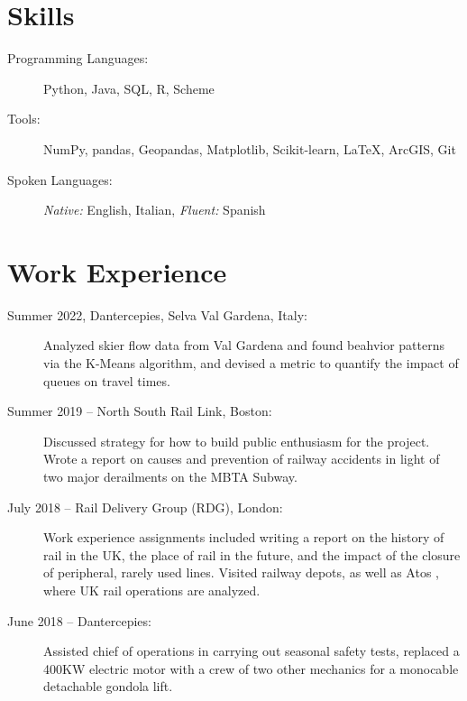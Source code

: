 \section*{Skills}
\secvspace
\begin{description}
    \item[Programming Languages:] Python, Java, SQL, R, Scheme
    \item[Tools:] NumPy, pandas, Geopandas, Matplotlib, Scikit-learn, \LaTeX, ArcGIS, Git
    \item[Spoken Languages:] {\em Native:} English, Italian, {\em Fluent:} Spanish
\end{description}
\cvhlineb
\section*{Work Experience}
\secvspace
\begin{description}
    \item[Summer 2022, Dantercepies, Selva Val Gardena, Italy:] Analyzed skier flow data from Val Gardena and found beahvior patterns via the K-Means algorithm, and devised a metric to quantify the impact of queues on travel times.
    \item[Summer 2019 -- North South Rail Link, Boston:]  Discussed strategy for how to build public enthusiasm for the project. Wrote a report on causes and prevention of railway accidents in light of two major derailments on the MBTA Subway.
    \item[July 2018 -- Rail Delivery Group (RDG), London: ] Work experience assignments included writing a report on the history of rail in the UK, the place of rail in the future, and the impact of the closure of peripheral, rarely used lines. Visited railway depots, as well as Atos , where UK rail operations are analyzed.

    \item[June 2018 -- Dantercepies:] Assisted chief of operations in carrying out seasonal safety tests, replaced a 400KW electric motor with a crew of two other mechanics for a monocable detachable gondola lift.
\end{description}
\cvhlineb
